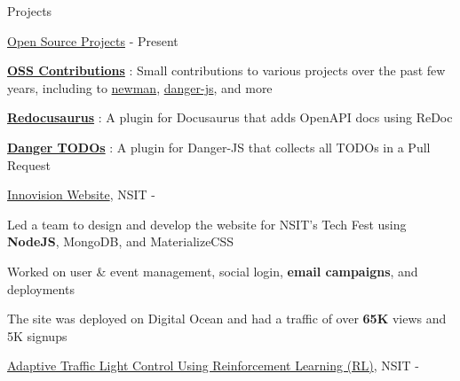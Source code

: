 \documentclass[../resume.tex]{subfiles}
\begin{document}
\begin{rSection}{Projects}

\begin{rSubsection}
    {\href{https://github.com/rohit-gohri}{Open Source Projects}}
    {  - Present }
    {}{}

    \item \href{https://rohit.page/contributions/?utm_source=resume&utm_medium=oss&utm_campaign=hf}{\textbf{OSS Contributions}}
        : Small contributions to various projects over the past few years, including to 
        \href{https://rohit.page/contributions/#oss-postmanlabs/newman?utm_source=resume&utm_medium=oss-newman&utm_campaign=hf}{newman},
        \href{https://rohit.page/contributions/#oss-danger/danger-js?utm_source=resume&utm_medium=oss-newman&utm_campaign=hf}{danger-js}, and more
    \item \href{https://rohit.page/blog/projects/openapi-for-docusaurus/?utm_source=resume&utm_medium=redoc&utm_campaign=hf}{\textbf{Redocusaurus}}
        : A plugin for Docusaurus that adds OpenAPI docs using ReDoc
    \item \href{https://rohit.page/blog/projects/dangerjs-plugin-todos/?utm_source=resume&utm_medium=danger&utm_campaign=hf}{\textbf{Danger TODOs}}
        : A plugin for Danger-JS that collects all TODOs in a Pull Request

\end{rSubsection}

\begin{rSubsection}
    {\href{https://github.com/rohit-gohri/inno}{Innovision Website}, {\nem NSIT}}
    {  -  }
    {}{}

    \item Led a team to design and develop the website for NSIT’s Tech Fest using \textbf{NodeJS}, MongoDB, and MaterializeCSS
    \item Worked on user \& event management, social login, \textbf{email campaigns}, and deployments
    \item The site was deployed on Digital Ocean and had a traffic of over \textbf{65K} views and 5K signups

\end{rSubsection}

\begin{rSubsection}
    {\href{https://github.com/rohit-gohri/trafficRL}{Adaptive Traffic Light Control Using Reinforcement Learning (RL)}, {\nem NSIT}}
    {  -  }
    {}{}


\end{rSubsection}
\end{rSection}
\end{document}
